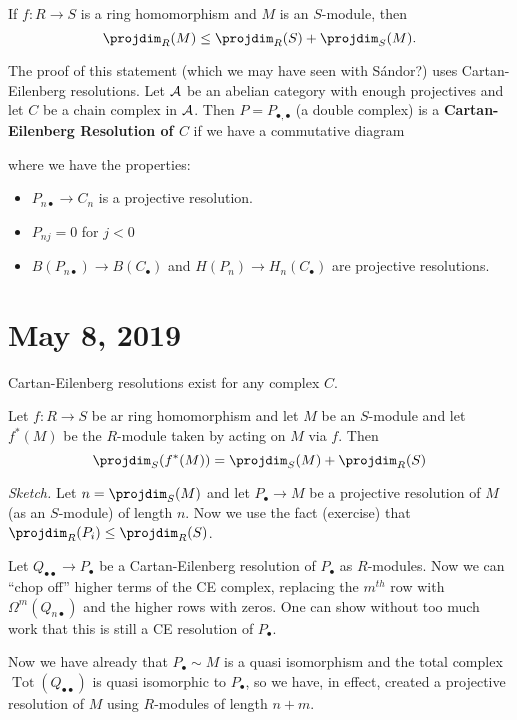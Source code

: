 \documentclass[12pt]{article}
\begin{document}
\begin{prop}
	If $f:R\to S$ is a ring homomorphism and $M$ is an $S$-module, then 
	\[\projdim_R(M)\le\projdim_R(S)+\projdim_S(M).\]
\end{prop}
\begin{prf}
	The proof of this statement (which we may have seen with S\'andor?) uses Cartan-Eilenberg resolutions.
	Let $\cal A$ be an abelian category with enough projectives and let $C$ be a chain complex in $\cal A$.
	Then $P=P_{\bullet,\bullet}$ (a double complex) is a \textbf{Cartan-Eilenberg Resolution of $C$} if we have 
	a commutative diagram
	\begin{center}
	\end{center}
	where we have the properties: 
	\begin{itemize}
		\item $P_{n\bullet}\to C_n$ is a projective resolution.
		\item $P_{nj}=0$ for $j<0$
		\item $B(P_{n\bullet})\to B(C_\bullet)$ and $H(P_n)\to H_n(C_\bullet)$ are projective resolutions.
	\end{itemize}
\end{prf}

\section{May 8, 2019}
\begin{lem}
	Cartan-Eilenberg resolutions exist for any complex $C$.
\end{lem}
\begin{prop}
	Let $f:R\to S$ be ar ring homomorphism and let $M$ be an $S$-module and let $f^\ast(M)$ be the $R$-module
	taken by acting on $M$ via $f$. Then 
	\[\projdim_S(f^\ast(M))=\projdim_S(M)+\projdim_R(S)\]
\end{prop}
\begin{prf}
	\textit{Sketch.} Let $n=\projdim_S(M)$ and let $P_\bullet\to M$ be a projective resolution of $M$ (as an $S$-module)
	of length $n$. Now we use the fact (exercise) that $\projdim_R(P_i)\le \projdim_R(S)$. 

	Let $Q_{\bullet\bullet}\to P_\bullet$ be a Cartan-Eilenberg resolution of $P_\bullet$ as $R$-modules. Now we can ``chop off''
	higher terms of the CE complex, replacing the $m^{th}$ row with $\Omega^m(Q_{n\bullet})$ and the higher rows with zeros. One can 
	show without too much work that this is still a CE resolution of $P_\bullet$.

	Now we have already that $P_\bullet\sim M$ is a quasi isomorphism and the total complex $\operatorname{Tot}(Q_{\bullet\bullet})$ 
	is quasi isomorphic to $P_\bullet$, so we have, in effect, created a projective resolution of $M$ using $R$-modules of length $n+m$.
\end{prf}
\end{document}
